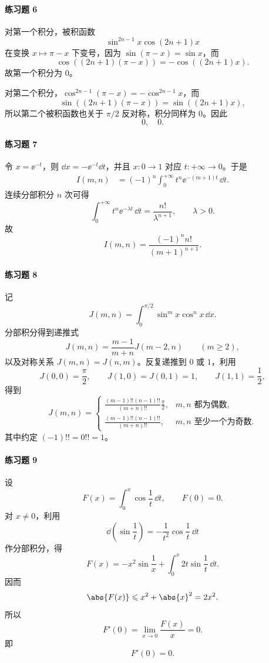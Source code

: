 \paragraph{练习题 6}
\begin{xsolution}
对第一个积分，被积函数
\[
  \sin^{2n-1}x\cos(2n+1)x
\]
在变换 $x\mapsto\pi-x$ 下变号，因为 $\sin(\pi-x)=\sin x$，而
\[
  \cos((2n+1)(\pi-x))=-\cos((2n+1)x).
\]
故第一个积分为 $0$。

对第二个积分，$\cos^{2n-1}(\pi-x)=-\cos^{2n-1}x$，而
\[
  \sin((2n+1)(\pi-x))=\sin((2n+1)x),
\]
所以第二个被积函数也关于 $\pi/2$ 反对称，积分同样为 $0$。因此
\[
  \boxed{0,\quad0}.
\]
\end{xsolution}

\paragraph{练习题 7}
\begin{xsolution}
令 $x=\ee^{-t}$，则 $\dd x=-\ee^{-t}\dd t$，并且 $x:0\to1$ 对应 $t:+\infty\to0$。于是
\begin{align*}
  I(m,n)
  &=(-1)^n\int_0^{+\infty}t^n\ee^{-(m+1)t}\,\dd t.
\end{align*}
连续分部积分 $n$ 次可得
\[
  \int_0^{+\infty}t^n\ee^{-\lambda t}\,\dd t
  =\frac{n!}{\lambda^{n+1}},\qquad\lambda>0.
\]
故
\[
  \boxed{I(m,n)=\frac{(-1)^n n!}{(m+1)^{n+1}}}.
\]
\end{xsolution}

\paragraph{练习题 8}
\begin{xsolution}
记
\[
  J(m,n)=\int_0^{\pi/2}\sin^m x\cos^n x\,\dd x.
\]
分部积分得到递推式
\[
  J(m,n)=\frac{m-1}{m+n}J(m-2,n)\qquad(m\geqslant2),
\]
以及对称关系 $J(m,n)=J(n,m)$。反复递推到 $0$ 或 $1$，利用
\[
  J(0,0)=\frac\pi2,
  \qquad
  J(1,0)=J(0,1)=1,
  \qquad
  J(1,1)=\frac12,
\]
得到
\[
  \boxed{
  J(m,n)=
  \begin{cases}
    \displaystyle
    \frac{(m-1)!!(n-1)!!}{(m+n)!!}\frac\pi2,
    &m,n\text{ 都为偶数},\\[8pt]
    \displaystyle
    \frac{(m-1)!!(n-1)!!}{(m+n)!!},
    &m,n\text{ 至少一个为奇数}.
  \end{cases}}
\]
其中约定 $(-1)!!=0!!=1$。
\end{xsolution}

\paragraph{练习题 9}
\begin{xsolution}
设
\[
  F(x)=\int_0^x\cos\frac1t\,\dd t,
  \qquad F(0)=0.
\]
对 $x\ne0$，利用
\[
  \dd\left(\sin\frac1t\right)=-\frac1{t^2}\cos\frac1t\,\dd t
\]
作分部积分，得
\[
  F(x)=-x^2\sin\frac1x+\int_0^x2t\sin\frac1t\,\dd t.
\]
因而
\[
  \abs{F(x)}\leqslant x^2+\abs{x}^2=2x^2.
\]
所以
\[
  F'(0)=\lim_{x\to0}\frac{F(x)}x=0.
\]
即
\[
  \boxed{F'(0)=0}.
\]
\end{xsolution}

